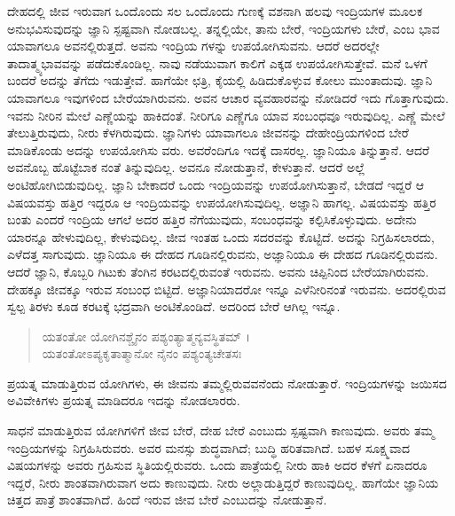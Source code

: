 ದೇಹದಲ್ಲಿ ಜೀವ ಇರುವಾಗ ಒಂದೊಂದು ಸಲ ಒಂದೊಂದು ಗುಣಕ್ಕೆ ವಶನಾಗಿ ಹಲವು ಇಂದ್ರಿಯಗಳ ಮೂಲಕ ಅನುಭವಿಸುವುದನ್ನು ಜ್ಞಾನಿ ಸ್ಪಷ್ಟವಾಗಿ ನೋಡಬಲ್ಲ. ತನ್ನಲ್ಲಿಯೇ, ತಾನು ಬೇರೆ, ಇಂದ್ರಿಯಗಳು ಬೇರೆ, ಎಂಬ ಭಾವ ಯಾವಾಗಲೂ ಅವನಲ್ಲಿರುತ್ತದೆ. ಅವನು ಇಂದ್ರಿಯ ಗಳನ್ನು ಉಪಯೋಗಿಸುವನು. ಆದರೆ ಅದರಲ್ಲೇ ತಾದಾತ್ಮ್ಯಭಾವವನ್ನು ಪಡೆದುಕೊಂಡಿಲ್ಲ. ನಾವು ನಡೆಯುವಾಗ ಕಾಲಿಗೆ ಎಕ್ಕಡ ಉಪಯೋಗಿಸುತ್ತೇವೆ. ಮನೆ ಒಳಗೆ ಬಂದರೆ ಅದನ್ನು ತೆಗೆದು ಇಡುತ್ತೇವೆ. ಹಾಗೆಯೇ ಛತ್ರಿ, ಕೈಯಲ್ಲಿ ಹಿಡಿದುಕೊಳ್ಳುವ ಕೋಲು ಮುಂತಾದುವು. ಜ್ಞಾನಿ ಯಾವಾಗಲೂ ಇವುಗಳಿಂದ ಬೇರೆಯಾಗಿರುವನು. ಅವನ ಆಚಾರ ವ್ಯವಹಾರವನ್ನು ನೋಡಿದರೆ ಇದು ಗೊತ್ತಾಗುವುದು. ಇವನು ನೀರಿನ ಮೇಲೆ ಎಣ್ಣೆಯನ್ನು ಹಾಕಿದಂತೆ. ನೀರಿಗೂ ಎಣ್ಣೆಗೂ ಯಾವ ಸಂಬಂಧವೂ ಇರುವುದಿಲ್ಲ. ಎಣ್ಣೆ ಮೇಲೆ ತೇಲುತ್ತಿರುವುದು, ನೀರು ಕೆಳಗಿರುವುದು. ಜ್ಞಾನಿಗಳು ಯಾವಾಗಲೂ ಜೀವನನ್ನು ದೇಹೇಂದ್ರಿಯಗಳಿಂದ ಬೇರೆ ಮಾಡಿಕೊಂಡು ಅದನ್ನು ಉಪಯೋಗಿಸು ವರು. ಅವರೆಂದಿಗೂ ಇದಕ್ಕೆ ದಾಸರಲ್ಲ. ಜ್ಞಾನಿಯೂ ತಿನ್ನುತ್ತಾನೆ. ಆದರೆ ಅವನೊಬ್ಬ ಹೊಟ್ಟೆಬಾಕ ನಂತೆ ತಿನ್ನುವುದಿಲ್ಲ. ಅವನೂ ನೋಡುತ್ತಾನೆ, ಕೇಳುತ್ತಾನೆ. ಆದರೆ ಅಲ್ಲೆ ಅಂಟಿಹೋಗಿಬಿಡುವುದಿಲ್ಲ. ಜ್ಞಾನಿ ಬೇಕಾದರೆ ಒಂದು ಇಂದ್ರಿಯವನ್ನು ಉಪಯೋಗಿಸುತ್ತಾನೆ, ಬೇಡದೆ ಇದ್ದರೆ ಆ ವಿಷಯವಸ್ತು ಹತ್ತಿರ ಇದ್ದರೂ ಆ ಇಂದ್ರಿಯವನ್ನು ಉಪಯೋಗಿಸುವುದಿಲ್ಲ. ಅಜ್ಞಾನಿ ಹಾಗಲ್ಲ. ವಿಷಯವಸ್ತು ಹತ್ತಿರ ಬಂತು ಎಂದರೆ ಇಂದ್ರಿಯ ಆಗಲೆ ಅದರ ಹತ್ತಿರ ನೆಗೆಯುವುದು, ಸಂಬಂಧವನ್ನು ಕಲ್ಪಿಸಿಕೊಳ್ಳುವುದು. ಅದೇನು ಯಾರನ್ನೂ ಹೇಳುವುದಿಲ್ಲ, ಕೇಳುವುದಿಲ್ಲ. ಜೀವ ಇಂತಹ ಒಂದು ಸದರವನ್ನು ಕೊಟ್ಟಿದೆ. ಅದನ್ನು ನಿಗ್ರಹಿಸಲಾರದು, ಎಳೆದತ್ತ ಸಾಗುವುದು. ಜ್ಞಾನಿಯೂ ಈ ದೇಹದ ಗೂಡಿನಲ್ಲಿರುವನು, ಅಜ್ಞಾನಿಯೂ ಈ ದೇಹದ ಗೂಡಿನಲ್ಲಿರುವನು. ಆದರೆ ಜ್ಞಾನಿ, ಕೊಬ್ಬರಿ ಗಿಟುಕು ತೆಂಗಿನ ಕರಟದಲ್ಲಿರುವಂತೆ ಇರುವನು. ಅವನು ಚಿಪ್ಪಿನಿಂದ ಬೇರೆಯಾಗಿರುವನು. ದೇಹಕ್ಕೂ ಜೀವಕ್ಕೂ ಇರುವ ಸಂಬಂಧ ಬಿಟ್ಟಿದೆ. ಅಜ್ಞಾನಿಯಾದರೋ ಇನ್ನೂ ಎಳೆನೀರಿನಂತೆ ಇರುವನು. ಅದರಲ್ಲಿರುವ ಸ್ವಲ್ಪ ತಿರಳು ಕೂಡ ಕರಟಕ್ಕೆ ಭದ್ರವಾಗಿ ಅಂಟಿಕೊಂಡಿದೆ. ಅದರಿಂದ ಬೇರೆ ಆಗಿಲ್ಲ ಇನ್ನೂ.

\begin{verse}
ಯತಂತೋ ಯೋಗಿನಶ್ಚೈನಂ ಪಶ್ಯಂತ್ಯಾತ್ಮನ್ಯವಸ್ಥಿತಮ್ ।\\ಯತಂತೋಽಪ್ಯಕೃತಾತ್ಮಾನೋ ನೈನಂ ಪಶ್ಯಂತ್ಯಚೇತಸಃ 
\end{verse}

{\small ಪ್ರಯತ್ನ ಮಾಡುತ್ತಿರುವ ಯೋಗಿಗಳು, ಈ ಜೀವನು ತಮ್ಮಲ್ಲಿರುವವನೆಂದು ನೋಡುತ್ತಾರೆ. ಇಂದ್ರಿಯಗಳನ್ನು ಜಯಿಸದ ಅವಿವೇಕಿಗಳು ಪ್ರಯತ್ನ ಮಾಡಿದರೂ ಇದನ್ನು ನೋಡಲಾರರು.}

ಸಾಧನೆ ಮಾಡುತ್ತಿರುವ ಯೋಗಿಗಳಿಗೆ ಜೀವ ಬೇರೆ, ದೇಹ ಬೇರೆ ಎಂಬುದು ಸ್ಪಷ್ಟವಾಗಿ ಕಾಣುವುದು. ಅವರು ತಮ್ಮ ಇಂದ್ರಿಯಗಳನ್ನು ನಿಗ್ರಹಿಸಿರುವರು. ಅವರ ಮನಸ್ಸು ಶುದ್ಧವಾಗಿದೆ; ಬುದ್ಧಿ ಹರಿತವಾಗಿದೆ. ಬಹಳ ಸೂಕ್ಷ್ಮವಾದ ವಿಷಯಗಳನ್ನು ಅವರು ಗ್ರಹಿಸುವ ಸ್ಥಿತಿಯಲ್ಲಿರುವರು. ಒಂದು ಪಾತ್ರೆಯಲ್ಲಿ ನೀರು ಹಾಕಿ ಅದರ ಕೆಳಗೆ ಏನಾದರೂ ಇದ್ದರೆ, ನೀರು ಶಾಂತವಾಗಿರುವಾಗ ಅದು ಕಾಣುವುದು. ನೀರು ಅಲ್ಲಾಡುತ್ತಿದ್ದರೆ ಕಾಣುವುದಿಲ್ಲ. ಹಾಗೆಯೇ ಜ್ಞಾನಿಯ ಚಿತ್ತದ ಪಾತ್ರೆ ಶಾಂತವಾಗಿದೆ. ಹಿಂದೆ ಇರುವ ಜೀವ ಬೇರೆ ಎಂಬುದನ್ನು ನೋಡುತ್ತಾನೆ.

